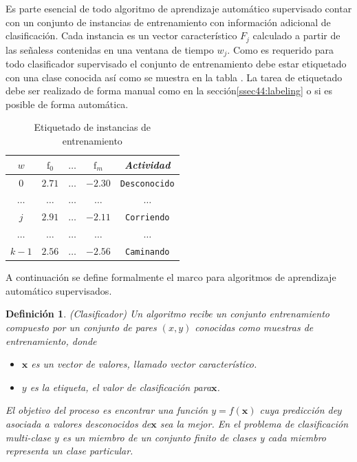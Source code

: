 Es parte esencial de todo algoritmo de aprendizaje automático supervisado
contar con un conjunto de instancias de entrenamiento con información
adicional de clasificación. Cada instancia es un vector característico
$F_{j}$ calculado a partir de las señales$s$ contenidas en una ventana
de tiempo $w_{j}$. Como es requerido para todo clasificador supervisado
el conjunto de entrenamiento debe estar etiquetado con una clase conocida
así como se muestra en la tabla . La tarea de
etiquetado debe ser realizado de forma manual como en la sección\ref{ssec44:labeling}
o si es posible de forma automática.

\begin{table}[!tbph]
\begin{centering}
\begin{tabular}{|c|c|c|c|c|}
\hline 
$w$ & $\mathrm{f}_{0}$ & $\ldots$ & $\mathrm{f}_{m}$ & \emph{Actividad}\tabularnewline
\hline 
\hline 
$0$ & $2.71$ & \texttt{$\ldots$} & \texttt{$-2.30$} & \texttt{\small{}Desconocido}\tabularnewline
\hline 
$\ldots$ & $\ldots$ & \texttt{$\ldots$} & \texttt{$\ldots$} & \texttt{$\ldots$}\tabularnewline
\hline 
$j$ & $2.91$ & \texttt{$\ldots$} & \texttt{$-2.11$} & \texttt{\small{}Corriendo}\tabularnewline
\hline 
$\ldots$ & $\ldots$ & \texttt{$\ldots$} & \texttt{$\ldots$} & \texttt{$\ldots$}\tabularnewline
\hline 
$k-1$ & $2.56$ & \texttt{$\ldots$} & \texttt{$-2.56$} & \texttt{\small{}Caminando}\tabularnewline
\hline 
\end{tabular}
\par\end{centering}
\caption[Etiquetado de instancias]{\label{tab4:labeled}Etiquetado de instancias de entrenamiento}
\end{table}

A continuación se define formalmente el marco para algoritmos de aprendizaje
automático supervisados\cite{Rajaraman2011}.

\label{def4:clasificacion}\newtheorem{defi}{Definición}\begin{defi}(Clasificador)
Un algoritmo recibe un conjunto entrenamiento compuesto
por un conjunto de pares $(x,y)$ conocidas como muestras de entrenamiento,
donde
\begin{itemize}
\item $\boldsymbol{x}$ es un\emph{ vector} de valores, llamado vector característico.
\item $y$ es la\emph{ etiqueta}, el valor de clasificación para$\boldsymbol{x}$.
\end{itemize}
El objetivo del proceso es encontrar una función $y=f(\boldsymbol{x})$
cuya predicción de$y$ asociada a valores desconocidos de$\boldsymbol{x}$
sea la mejor. En el problema de clasificación multi-clase $y$ es
un miembro de un conjunto finito de clases y cada miembro representa
un clase particular.\end{defi}

